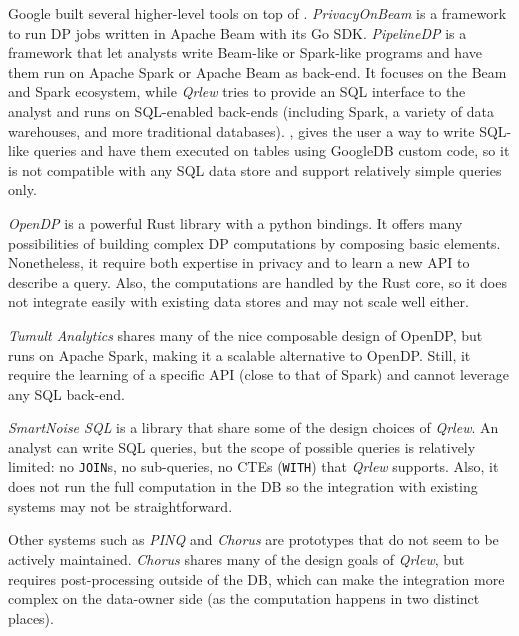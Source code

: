 \documentclass{article}
\newcommand{\qrlew}{\emph{Qrlew}}
\begin{document}
    Google built several higher-level tools on top of \cite{GoogleDP}.
    \emph{PrivacyOnBeam} \cite{PrivacyOnBeam} is a framework to run DP jobs written in Apache Beam with its Go SDK.
    \emph{PipelineDP} \cite{PipelineDP} is a framework that let analysts write Beam-like or Spark-like programs and have them run on Apache Spark or Apache Beam as back-end. It focuses on the Beam and Spark ecosystem, while \qrlew{} tries to provide an SQL interface to the analyst and runs on SQL-enabled back-ends (including Spark, a variety of data warehouses, and more traditional databases).
    \cite{ZetaSQL}, gives the user a way to write SQL-like queries and have them executed on tables using GoogleDB custom code, so it is not  compatible with any SQL data store and support relatively simple queries only.
    
    \emph{OpenDP} \cite{OpenDP} is a powerful Rust library with a python bindings. It offers many possibilities of building complex DP computations by composing basic elements. Nonetheless, it require both expertise in privacy and to learn a new API to describe a query. Also, the computations are handled by the Rust core, so it does not integrate easily with existing data stores and may not scale well either.
    
    \emph{Tumult Analytics} \cite{berghel2022tumult} shares many of the nice composable design of OpenDP, but runs on Apache Spark, making it a scalable alternative to OpenDP. Still, it require the learning of a specific API (close to that of Spark) and cannot leverage any SQL back-end.
    
    \emph{SmartNoise SQL} is a library that share some of the design choices of \qrlew{}. An analyst can write SQL queries, but the scope of possible queries is relatively limited: no \texttt{JOIN}s, no sub-queries, no CTEs (\texttt{WITH}) that \qrlew{} supports. Also, it does not run the full computation in the DB so the integration with existing systems may not be straightforward.
    
    Other systems such as \emph{PINQ} \cite{mcsherry2009privacy} and \emph{Chorus} \cite{johnson2020chorus} are prototypes that do not seem to be actively maintained. \emph{Chorus} shares many of the design goals of \qrlew{}, but requires post-processing outside of the DB, which can make the integration more complex on the data-owner side (as the computation happens in two distinct places).
    
\end{document}
